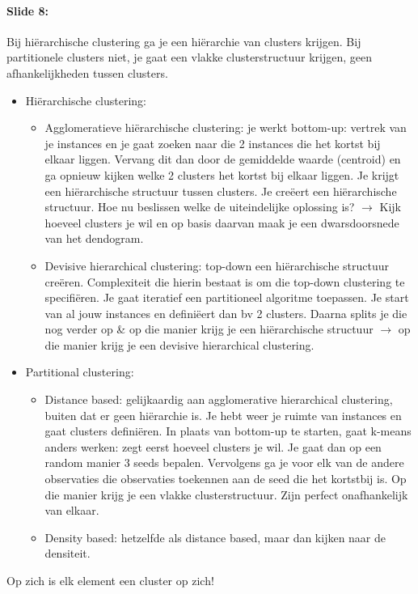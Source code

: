 \documentclass[10pt,a4paper]{report}
\begin{document}
\paragraph{Slide 8:}Bij hi\"erarchische clustering ga je een hi\"erarchie van clusters krijgen. Bij partitionele clusters niet, je gaat een vlakke clusterstructuur krijgen, geen afhankelijkheden tussen clusters.
\begin{itemize}
\item Hi\"erarchische clustering:
\begin{itemize}
\item Agglomeratieve hi\"erarchische clustering: je werkt bottom-up: vertrek van je instances en je gaat zoeken naar die 2 instances die het kortst bij elkaar liggen. Vervang dit dan door de gemiddelde waarde (centroid) en ga opnieuw kijken welke 2 clusters het kortst bij elkaar liggen.  Je krijgt een hi\"erarchische structuur tussen clusters. Je cre\"eert een hi\"erarchische structuur. Hoe nu beslissen welke de uiteindelijke oplossing is? $\rightarrow$ Kijk hoeveel clusters je wil en op basis  daarvan maak je een dwarsdoorsnede van het dendogram. 
\item Devisive hierarchical clustering: top-down een hi\"erarchische structuur cre\"eren. Complexiteit die hierin bestaat is om die top-down clustering te specifi\"eren. Je gaat iteratief een partitioneel algoritme toepassen. Je start van al jouw instances en defini\"eert dan bv 2 clusters. Daarna splits je die nog verder op \& op die manier krijg je een hi\"erarchische structuur $\rightarrow$ op die manier krijg je een devisive hierarchical clustering.
\end{itemize}
\item Partitional clustering: 
\begin{itemize}
\item Distance based: gelijkaardig aan agglomerative hierarchical clustering, buiten dat er geen hi\"erarchie is. Je hebt weer je ruimte van instances en gaat clusters defini\"eren. In plaats van bottom-up te starten, gaat k-means anders werken: zegt eerst hoeveel clusters je wil. Je gaat dan op een random manier 3 seeds bepalen. Vervolgens ga je voor elk van de andere observaties die observaties toekennen aan de seed die het kortstbij is. Op die manier krijg je een vlakke clusterstructuur. Zijn perfect onafhankelijk van elkaar.
\item Density based: hetzelfde als distance based, maar dan kijken naar de densiteit.
\end{itemize}
\end{itemize}
Op zich is elk element een cluster op zich!
\end{document}
